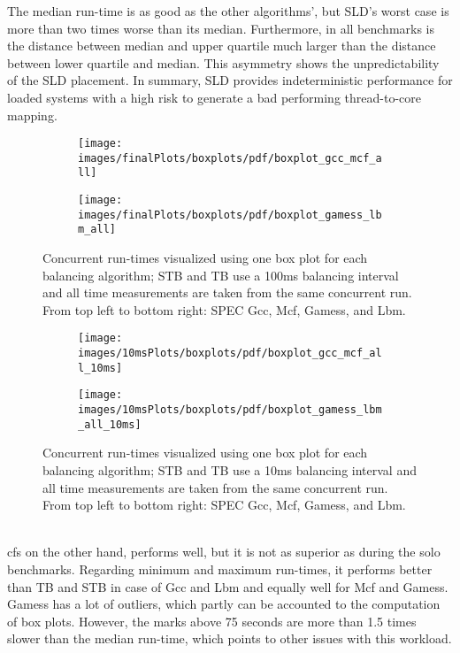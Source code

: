 The median run-time is as good as the other algorithms', but SLD's worst case
is more than two times worse than its median.
Furthermore, in all benchmarks is the distance between median and upper quartile
much larger than the distance between lower quartile and median.
This asymmetry shows the unpredictability of the SLD placement.
In summary, SLD provides indeterministic performance for loaded systems with a
high risk to generate a bad performing thread-to-core mapping.
%
\begin{figure}[h!]
  \begin{subfigure}{\textwidth}
  \texttt{[image: images/finalPlots/boxplots/pdf/boxplot\_gcc\_mcf\_all]}
  \end{subfigure}
  \begin{subfigure}{\textwidth}
  \texttt{[image: images/finalPlots/boxplots/pdf/boxplot\_gamess\_lbm\_all]}
  \end{subfigure}
  \caption{Concurrent run-times visualized using one box plot for each balancing
    algorithm; STB and TB use a 100ms balancing interval and all time
    measurements are taken from the same concurrent run.
    From top left to bottom right: SPEC Gcc, Mcf, Gamess, and Lbm.
    }
    \label{eval:fig:box_all}
\end{figure}
%
\begin{figure}[!ht]
  \begin{subfigure}{\textwidth}
  \texttt{[image: images/10msPlots/boxplots/pdf/boxplot\_gcc\_mcf\_all\_10ms]}
  \end{subfigure}
  \begin{subfigure}{\textwidth}
  \texttt{[image: images/10msPlots/boxplots/pdf/boxplot\_gamess\_lbm\_all\_10ms]}
  \end{subfigure}
  \caption{Concurrent run-times visualized using one box plot for each balancing
    algorithm; STB and TB use a 10ms balancing interval and all time
    measurements are taken from the same concurrent run.
    From top left to bottom right: SPEC Gcc, Mcf, Gamess, and Lbm.
    }
  \label{eval:fig:box_all_10ms}
\end{figure}
\\


\Gls{cfs} on the other hand, performs well, but it is not as superior as during
the solo benchmarks.
Regarding minimum and maximum run-times, it performs better than TB and STB in
case of Gcc and Lbm and equally well for Mcf and Gamess.
Gamess has a lot of outliers, which partly can be accounted to the computation
of box plots.
However, the marks above 75 seconds are more than 1.5 times slower than the
median run-time, which points to other issues with this workload.

